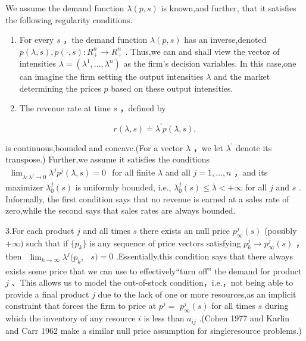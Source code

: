 We assume the demand function \(\lambda ( p , s )\) is known,and
further, that it satisfies the following regularity conditions.

\begin{enumerate}
\def\labelenumi{\arabic{enumi}.}
\item
  For every \(s\) ，the demand function \(\lambda ( p , s )\) has an
  inverse,denoted
  \(p ( \lambda , s ) , p ( \cdot , s ) \colon R _ { + } ^ { n } \to R _ { + } ^ { n }\)
  . Thus,we can and shall view the vector of intensities
  \(\lambda = ( \lambda ^ { 1 } , \ldots , \lambda ^ { n } )\) as the
  firm's decision variables. In this case,one can imagine the firm
  setting the output intensities \(\lambda\) and the market determining
  the prices \(p\) based on these output intensities.
\item
  The revenue rate at time \(s\) ，defined by
\end{enumerate}

\[
r ( \lambda , s ) \doteq \lambda ^ { \prime } p ( \lambda , s ) ,
\]

is continuous,bounded and concave.(For a vector \(\lambda\) ，we let
\(\lambda ^ { \prime }\) denote its transpose.) Further,we assume it
satisfies the conditions
\(\begin{array} { r } { \operatorname* { l i m } _ { \lambda : \lambda ^ { j } \to 0 } \lambda ^ { j } p ^ { j } ( \lambda , s ) = 0 } \end{array}\)
for all finite \(\lambda\) and all \(j = 1 , \dotsc , n\) ，and its
maximizer \(\lambda _ { 0 } ^ { j } ( s )\) is uniformly bounded, i.e.,
\(\lambda _ { 0 } ^ { j } ( s ) \leqslant \overline { { \lambda } } < + \infty\)
for all \(j\) and \(s\) . Informally, the first condition says that no
revenue is earned at a sales rate of zero,while the second says that
sales rates are always bounded.

3.For each product \(j\) and all times \(s\) there exists an null price
\(p _ { \infty } ^ { j } ( s )\) (possibly \(+ \infty )\) such that if
\(\{ p _ { k } \}\) is any sequence of price vectors satisfying
\(p _ { k } ^ { j } \to p _ { \infty } ^ { j } ( s )\) ，then
\(\begin{array} { r } { \operatorname* { l i m } _ { k \to \infty } \lambda ^ { j } ( p _ { k } , } \end{array}\)
\(s ) = 0\) .Essentially,this condition says that there always exists
some price that we can use to effectively``turn off'' the demand for
product \(j\) 、This allows us to model the out-of-stock
condition，i.e.，not being able to provide a final product \(j\) due to
the lack of one or more resources,as an implicit constraint that forces
the firm to price at \(p ^ { j } =\) \(p _ { \infty } ^ { j } ( s )\)
for all times \(s\) during which the inventory of any resource \(i\) is
less than \(a _ { i j }\) .(Cohen 1977 and Karlin and Carr 1962 make a
similar null price assumption for singleresource problems.)

